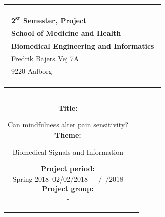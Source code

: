 % 
\thispagestyle{empty}
\begin{titlepage}
\begin{nopagebreak}
{\samepage 

\begin{tabular}{r}
\parbox{\textwidth}{  
\hfill \hspace{2cm} \parbox{8cm}{\begin{tabular}{l} %
{\small \textbf{\textcolor{aaublue}{{2\textsuperscript{st} Semester, Project}}}}\\
{\small \textbf{\textcolor{aaublue}{School of Medicine and Health}}}\\
{\small \textbf{\textcolor{aaublue}{Biomedical Engineering and Informatics}}}\\
{\small \textcolor{aaublue}{Fredrik Bajers Vej 7A}} \\
{\small \textcolor{aaublue}{9220 Aalborg}} \\
\end{tabular}}}
\end{tabular}

\begin{tabular}{cc}
\parbox{7cm}{

\textbf{Title:}

Can mindfulness alter pain sensitivity? \\ 

\textbf{Theme:}

\small{
 Biomedical Signals and Information\\
}


\parbox{8cm}{


\textbf{Project period:}\\
Spring 2018\
02/02/2018 - --/--/2018\\
   
\textbf{Project group:}\\
-\\ %
  
}}
\end{tabular}}
\end{nopagebreak}
\end{titlepage}
